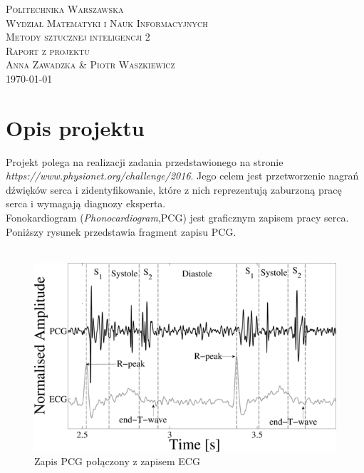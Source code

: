 \documentclass[a4paper]{report}
\begin{document}
\begin{center}

\textsc{\large Politechnika Warszawska}\\[0.1cm]
\textsc{\large Wydział Matematyki i Nauk Informacyjnych}\\[0.7cm]
\textsc{\Large Metody sztucznej inteligencji 2}\\[0.1cm]
\textsc{\large Raport z projektu}\\[0.5cm]
\textsc{\large Anna Zawadzka \& Piotr Waszkiewicz}\\[0.2cm]
{\large \today}\\[1cm]
\end{center}

\section{Opis projektu}

Projekt polega na realizacji zadania przedstawionego na stronie\\
\textit{https://www.physionet.org/challenge/2016}. Jego celem jest przetworzenie nagrań dźwięków serca i zidentyfikowanie, które z nich reprezentują zaburzoną pracę serca i wymagają diagnozy eksperta.\\
Fonokardiogram (\textit{Phonocardiogram},PCG) jest graficznym zapisem pracy serca. Poniższy rysunek przedstawia fragment zapisu PCG.\\\\

\begin{figure}[!htp]
    \centering
    \includegraphics[scale=0.5]{figure1}
    \caption{Zapis PCG połączony z zapisem ECG}
    \label{figure1}
\end{figure}
\end{document}
